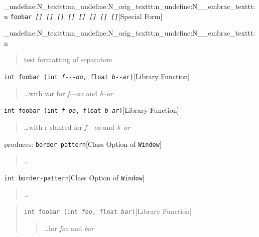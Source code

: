 \documentclass{book}
\begin{document}
\ExplSyntaxOn%
\cs_undefine:N{\embrac_texttt:nn}\cs_undefine:N{\embrac_orig_texttt:n}\cs_undefine:N{\__embrac_texttt:n}%
\ExplSyntaxOff%
%
\noindent\texttt{foobar \EmbracOn{}\textnormal{\textsl{[{]} \EmbracOff{}\textnormal{[{]}}\EmbracOn{} \textsl{[{]}} \texttt{[{]}} \texttt{[{]}} \EmbracOff{}\textnormal{\textsl{[{]}}}\EmbracOn{} \EmbracOff{}\textnormal{\texttt{[{]}}}\EmbracOn{} \EmbracOff{}\textnormal{\texttt{\textsl{[{]}}}}\EmbracOn{}}}\EmbracOff{}}\hfill[Special Form]


\ExplSyntaxOn%
\cs_undefine:N{\embrac_texttt:nn}\cs_undefine:N{\embrac_orig_texttt:n}\cs_undefine:N{\__embrac_texttt:n}%
\ExplSyntaxOff%
%
\begin{quote}
test formatting of separators
\end{quote}

\noindent\texttt{int foobar (int \textsl{f{-}{-}{-}oo}, float \textsl{b{-}{-}ar})}\hfill[Library Function]



%
\begin{quote}
\dots{}\@ with var for \textsl{f---oo} and \textsl{b--ar}
\end{quote}

\noindent\texttt{int foobar (int \textnormal{\textsl{f---oo}}, float \textnormal{\textsl{b--ar}})}\hfill[Library Function]



%
\begin{quote}
\dots{}\@ with r slanted for \textsl{f---oo} and \textsl{b--ar}
\end{quote}

\noindent{}produces:
\noindent\texttt{border-pattern}\hfill[Class Option of \texttt{Window}]



%
\begin{quote}
\dots{}\@
\end{quote}

\noindent\texttt{\texttt{int} border-pattern}\hfill[Class Option of \texttt{Window}]



%
\begin{quote}
\dots{}\@
\end{quote}

\begin{quote}
\noindent\texttt{int foobar (int \textsl{foo}, float \textsl{bar})}\hfill[Library Function]



%
\begin{quote}
\dots{}\@ for \textsl{foo} and \textsl{bar}
\end{quote}
\end{quote}
\end{document}
